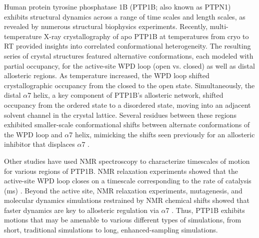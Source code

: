 \documentclass[9pt,review]{livecoms}
\begin{document}
Human protein tyrosine phosphatase 1B (PTP1B; also known as PTPN1) exhibits structural dynamics across a range of time scales and length scales, as revealed by numerous structural biophysics experiments.
Recently, multi-temperature X-ray crystallography of apo PTP1B at temperatures from cryo to RT \cite{keedy_expanded_2018} provided insights into correlated conformational heterogeneity.
The resulting series of crystal structures featured alternative conformations, each modeled with partial occupancy, for the active-site WPD loop (open vs. closed) as well as distal allosteric regions.
As temperature increased, the WPD loop shifted crystallographic occupancy from the closed to the open state.
Simultaneously, the distal $\alpha$7 helix, a key component of PTP1B’s allosteric network, shifted occupancy from the ordered state to a disordered state, moving into an adjacent solvent channel in the crystal lattice.
Several residues between these regions exhibited smaller-scale conformational shifts between alternate conformations of the WPD loop and $\alpha$7 helix, mimicking the shifts seen previously for an allosteric inhibitor that displaces $\alpha$7 \cite{wiesmann_allosteric_2004}.

Other studies have used NMR spectroscopy to characterize timescales of motion for various regions of PTP1B.
NMR relaxation experiments showed that the active-site WPD loop closes on a timescale corresponding to the rate of catalysis (ms) \cite{whittier_conformational_2013}.
Beyond the active site, NMR relaxation experiments, mutagenesis, and molecular dynamics simulations restrained by NMR chemical shifts showed that faster dynamics are key to allosteric regulation via $\alpha$7 \cite{choy_conformational_2017}.
Thus, PTP1B exhibits motions that may be amenable to various different types of simulations, from short, traditional simulations to long, enhanced-sampling simulations.
\end{document}
